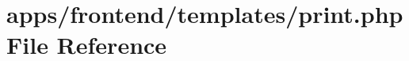 \hypertarget{frontend_2templates_2print_8php}{\section{apps/frontend/templates/print.php File Reference}
\label{frontend_2templates_2print_8php}
}
